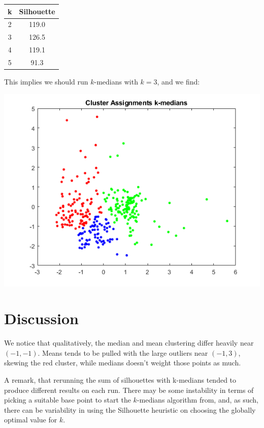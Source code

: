 \documentclass[sn-mathphys,Numbered]{sn-jnl}
\begin{document}
\begin{center}
\begin{tabular}{|| c| c||}
\hline
k & Silhouette \\

\hline \hline
2 & 119.0 \\ \hline
3 & 126.5 \\ \hline
4 & 119.1 \\ \hline
5 & 91.3 \\ \hline
\end{tabular}
\end{center}

This implies we should run $k$-medians with $k=3$, and we find:

\begin{center}
\includegraphics[width=\linewidth]{k_medians_clusters}
\end{center}

\section{Discussion}

We notice that qualitatively, the median and mean clustering differ heavily near $(-1,-1)$. Means tends to be pulled with the large outliers near $(-1,3)$, skewing the red cluster, while medians doesn't weight those points as much.

A remark, that rerunning the sum of silhouettes with k-medians tended to produce different results on each run. There may be some instability in terms of picking a suitable base point to start the $k$-medians algorithm from, and, as such, there can be variability in using the Silhouette heuristic on choosing the globally optimal value for $k$.
\end{document}
